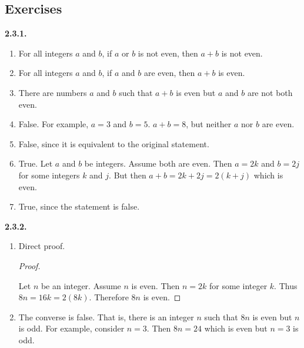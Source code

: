 \documentclass[12pt,]{book}
\theoremstyle{plain}
\theoremstyle{definition}
\theoremstyle{definition}
\theoremstyle{definition}
\numberwithin{equation}{chapter}
\begin{document}
\subsection*{ Exercises}
\noindent\textbf{2.3.1.} \hypertarget{p-1413}{}%
\leavevmode%
\begin{enumerate}[label=(\alph*)]
\item\hypertarget{li-663}{}\hypertarget{p-1414}{}%
For all integers \(a\) and \(b\), if \(a\) or \(b\) is not even, then \(a+b\) is not even.%
\item\hypertarget{li-664}{}\hypertarget{p-1415}{}%
For all integers \(a\) and \(b\), if \(a\) and \(b\) are even, then \(a+b\) is even.%
\item\hypertarget{li-665}{}\hypertarget{p-1416}{}%
There are numbers \(a\) and \(b\) such that \(a+b\) is even but \(a\) and \(b\) are not both even.%
\item\hypertarget{li-666}{}\hypertarget{p-1417}{}%
False. For example, \(a = 3\) and \(b = 5\). \(a+b = 8\), but neither \(a\) nor \(b\) are even.%
\item\hypertarget{li-667}{}\hypertarget{p-1418}{}%
False, since it is equivalent to the original statement.%
\item\hypertarget{li-668}{}\hypertarget{p-1419}{}%
True. Let \(a\) and \(b\) be integers. Assume both are even. Then \(a = 2k\) and \(b = 2j\) for some integers \(k\) and \(j\). But then \(a+b = 2k + 2j = 2(k+j)\) which is even.%
\item\hypertarget{li-669}{}\hypertarget{p-1420}{}%
True, since the statement is false.%
\end{enumerate}
%
\par\smallskip
\noindent\textbf{2.3.2.} \hypertarget{p-1425}{}%
\leavevmode%
\begin{enumerate}[label=(\alph*)]
\item\hypertarget{li-672}{}\hypertarget{p-1426}{}%
Direct proof. \begin{proof}\hypertarget{proof-32}{}
\hypertarget{p-1427}{}%
Let \(n\) be an integer. Assume \(n\) is even. Then \(n = 2k\) for some integer \(k\). Thus \(8n = 16k = 2(8k)\). Therefore \(8n\) is even.%
\end{proof}
%
\item\hypertarget{li-673}{}\hypertarget{p-1428}{}%
The converse is false. That is, there is an integer \(n\) such that \(8n\) is even but \(n\) is odd. For example, consider \(n = 3\). Then \(8n = 24\) which is even but \(n = 3\) is odd.%
\end{enumerate}
%
\par\smallskip
\end{document}
